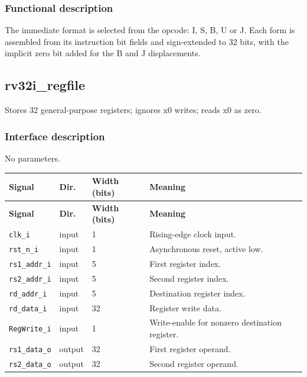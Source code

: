 \documentclass[11pt]{article}
\begin{document}
\subsubsection{Functional description}
\noindent The immediate format is selected from the opcode: I, S, B, U or J. Each form is assembled from its instruction bit fields and sign-extended to 32 bits, with the implicit zero bit added for the B and J displacements.\par\medskip

\subsection{rv32i\_regfile}
Stores 32 general-purpose registers; ignores x0 writes; reads x0 as zero.
\subsubsection{Interface description}
\noindent No parameters.\par\medskip
{\small
\begin{longtable}{@{}L{0.3400\dimexpr\linewidth-36pt\relax}L{0.1000\dimexpr\linewidth-36pt\relax}L{0.1000\dimexpr\linewidth-36pt\relax}L{0.4600\dimexpr\linewidth-36pt\relax}@{}}
\toprule
\textbf{Signal} & \textbf{Dir.} & \textbf{Width (bits)} & \textbf{Meaning} \\ \midrule
\endfirsthead
\toprule
\textbf{Signal} & \textbf{Dir.} & \textbf{Width (bits)} & \textbf{Meaning} \\ \midrule
\endhead
\texttt{clk\_i} & input & 1 & Rising-edge clock input. \\ \addlinespace[3pt]
\texttt{rst\_n\_i} & input & 1 & Asynchronous reset, active low. \\ \addlinespace[3pt]
\texttt{rs1\_addr\_i} & input & 5 & First register index. \\ \addlinespace[3pt]
\texttt{rs2\_addr\_i} & input & 5 & Second register index. \\ \addlinespace[3pt]
\texttt{rd\_addr\_i} & input & 5 & Destination register index. \\ \addlinespace[3pt]
\texttt{rd\_data\_i} & input & 32 & Register write data. \\ \addlinespace[3pt]
\texttt{RegWrite\_i} & input & 1 & Write-enable for nonzero destination register. \\ \addlinespace[3pt]
\texttt{rs1\_data\_o} & output & 32 & First register operand. \\ \addlinespace[3pt]
\texttt{rs2\_data\_o} & output & 32 & Second register operand. \\*
\bottomrule\end{longtable}}
\end{document}
